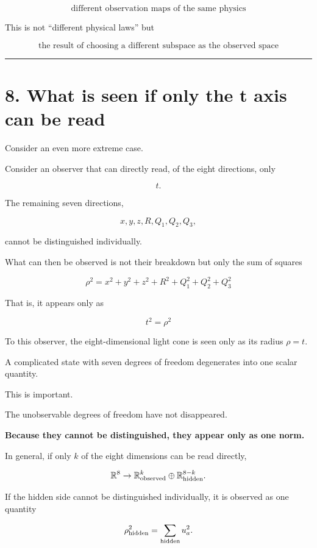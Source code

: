 \documentclass[
  a4paper,
]{article}
\begin{document}
\[
\boxed{
\text{different observation maps of the same physics}
}
\]

This is not ``different physical laws'' but

\[
\boxed{
\text{the result of choosing a different subspace as the observed space}
}
\]

\begin{center}\rule{0.5\linewidth}{0.5pt}\end{center}

\section{8. What is seen if only the t axis can be
read}\label{what-is-seen-if-only-the-t-axis-can-be-read}

Consider an even more extreme case.

Consider an observer that can directly read, of the eight directions,
only

\[
t .
\]

The remaining seven directions,

\[
x,y,z,R,Q_1,Q_2,Q_3 ,
\]

cannot be distinguished individually.

What can then be observed is not their breakdown but only the sum of
squares

\[
\boxed{
\rho^2=
x^2+y^2+z^2
+R^2
+Q_1^2+Q_2^2+Q_3^2
}
\]

That is, it appears only as

\[
\boxed{
t^2=\rho^2
}
\]

To this observer, the eight-dimensional light cone is seen only as its
radius \(\rho=t\).

A complicated state with seven degrees of freedom degenerates into one
scalar quantity.

This is important.

The unobservable degrees of freedom have not disappeared.

\textbf{Because they cannot be distinguished, they appear only as one
norm.}

In general, if only \(k\) of the eight dimensions can be read directly,

\[
\mathbb R^8
\rightarrow
\mathbb R^k_{\rm observed}
\oplus
\mathbb R^{8-k}_{\rm hidden} .
\]

If the hidden side cannot be distinguished individually, it is observed
as one quantity

\[
\rho_{\rm hidden}^2
=
\sum_{\rm hidden}u_a^2 .
\]
\end{document}
